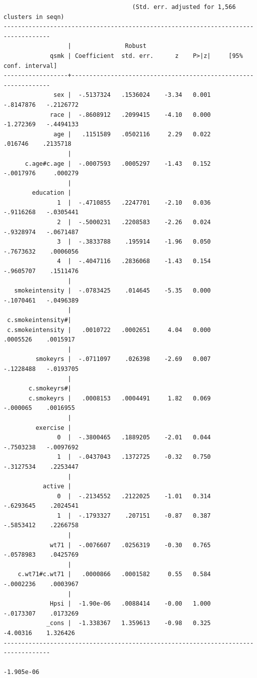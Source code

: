 \documentclass[
  10pt,
  a4paper,
]{book}
\begin{document}
\begin{verbatim}
                                    (Std. err. adjusted for 1,566 clusters in seqn)
-----------------------------------------------------------------------------------
                  |               Robust
             qsmk | Coefficient  std. err.      z    P>|z|     [95% conf. interval]
------------------+----------------------------------------------------------------
              sex |  -.5137324   .1536024    -3.34   0.001    -.8147876   -.2126772
             race |  -.8608912   .2099415    -4.10   0.000    -1.272369   -.4494133
              age |   .1151589   .0502116     2.29   0.022      .016746    .2135718
                  |
      c.age#c.age |  -.0007593   .0005297    -1.43   0.152    -.0017976     .000279
                  |
        education |
               1  |  -.4710855   .2247701    -2.10   0.036    -.9116268   -.0305441
               2  |  -.5000231   .2208583    -2.26   0.024    -.9328974   -.0671487
               3  |  -.3833788    .195914    -1.96   0.050    -.7673632    .0006056
               4  |  -.4047116   .2836068    -1.43   0.154    -.9605707    .1511476
                  |
   smokeintensity |  -.0783425    .014645    -5.35   0.000    -.1070461   -.0496389
                  |
 c.smokeintensity#|
 c.smokeintensity |   .0010722   .0002651     4.04   0.000     .0005526    .0015917
                  |
         smokeyrs |  -.0711097    .026398    -2.69   0.007    -.1228488   -.0193705
                  |
       c.smokeyrs#|
       c.smokeyrs |   .0008153   .0004491     1.82   0.069     -.000065    .0016955
                  |
         exercise |
               0  |  -.3800465   .1889205    -2.01   0.044    -.7503238   -.0097692
               1  |  -.0437043   .1372725    -0.32   0.750    -.3127534    .2253447
                  |
           active |
               0  |  -.2134552   .2122025    -1.01   0.314    -.6293645    .2024541
               1  |  -.1793327    .207151    -0.87   0.387    -.5853412    .2266758
                  |
             wt71 |  -.0076607   .0256319    -0.30   0.765    -.0578983    .0425769
                  |
    c.wt71#c.wt71 |   .0000866   .0001582     0.55   0.584    -.0002236    .0003967
                  |
             Hpsi |  -1.90e-06   .0088414    -0.00   1.000    -.0173307    .0173269
            _cons |  -1.338367   1.359613    -0.98   0.325     -4.00316    1.326426
-----------------------------------------------------------------------------------

-1.905e-06











\end{verbatim}
\end{document}
